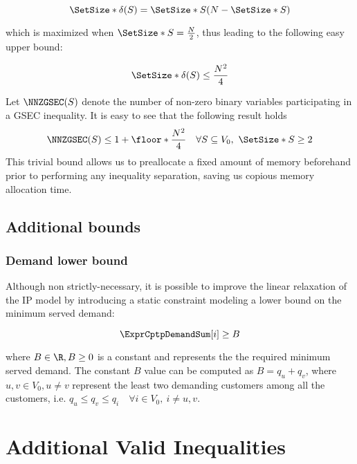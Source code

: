 \begin{equation}\label{eq:delta-s-set-size}
	\SetSize*{\delta(S)} = \SetSize*{S} (N - \SetSize*{S})
\end{equation}

which is maximized when $\SetSize*{S} = \frac{N}{2}$, thus leading to the following easy upper bound:

\begin{equation}\label{eq:delta-s-set-size-ub}
	\SetSize*{\delta(S)} \le \frac{N^2}{4}
\end{equation}

Let $\NNZGSEC(S)$ denote the number of non-zero binary variables participating in a GSEC inequality.
It is easy to see that the following result holds
\begin{equation}\label{eq:gsec-nnz-ub}
	\NNZGSEC(S) \le 1 + \floor*{\frac{N^2}{4}} \quad \forall S \subseteq V_0,\ \SetSize*{S} \ge 2
\end{equation}
This trivial bound allows us to preallocate a fixed amount of memory beforehand prior to performing any inequality separation, saving us copious memory allocation time.

\subsection{Additional bounds}

\subsubsection{Demand lower bound}\label{sec:demand-lower-bound}
Although non strictly-necessary, it is possible to improve the linear relaxation of the IP model by introducing a static constraint modeling a lower bound on the minimum served demand:

\begin{equation}\label{eq:resource-lower-bound-constraint}
	\ExprCptpDemandSum[i]   \ge B
\end{equation}

where $B \in \R, B \ge 0$ is a constant and represents the the required minimum served demand.
The constant $B$ value can be computed as $B = q_u + q_v$, where $u, v \in V_0, u \ne v$ represent the least two demanding customers among all the customers, i.e. $q_u \le q_v \le q_i \quad \forall i \in V_0,\ i \ne u, v$.

\section{Additional Valid Inequalities}\label{sec:additional-valid-inequalities}

